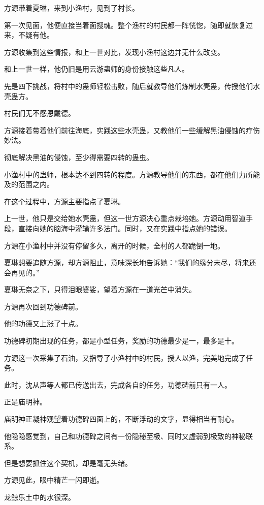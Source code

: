 
\begin{this_body}

方源带着夏琳，来到小渔村，见到了村长。

第一次见面，他便直接当着面搜魂。整个渔村的村民都一阵恍惚，随即就恢复过来，不疑有他。

方源收集到这些情报，和上一世对比，发现小渔村这边并无什么改变。

和上一世一样，他仍旧是用云游蛊师的身份接触这些凡人。

先是四下挑战，将村中的蛊师轻松击败，随后就教导他们炼制水壳蛊，传授他们水壳蛊方。

村民们无不感恩戴德。

方源接着带着他们前往海底，实践这些水壳蛊，又教他们一些缓解黑油侵蚀的疗伤妙法。

彻底解决黑油的侵蚀，至少得需要四转的蛊虫。

小渔村中的蛊师，根本达不到四转的程度。方源教导他们的东西，都在他们力所能及的范围之内。

在这个过程中，方源主要指点了夏琳。

上一世，他只是交给她水壳蛊，但这一世方源决心重点栽培她。方源动用智道手段，直接向她的脑海中灌输许多法门。同时，又在实践中指点她的错误。

方源在小渔村中并没有停留多久，离开的时候，全村的人都跪倒一地。

夏琳想要追随方源，却方源阻止，意味深长地告诉她：“我们的缘分未尽，将来还会再见的。”

夏琳无奈之下，只得泪眼婆娑，望着方源在一道光芒中消失。

方源再次回到功德碑前。

他的功德又上涨了十点。

功德碑初期出现的任务，都是小型任务，奖励的功德最少是一，最多是十。

方源这一次采集了石油，又指导了小渔村中的村民，授人以渔，完美地完成了任务。

此时，沈从声等人都已传送出去，完成各自的任务，功德碑前只有一人。

正是庙明神。

庙明神正凝神观望着功德碑四面上的，不断浮动的文字，显得相当有耐心。

他隐隐感觉到，自己和功德碑之间有一份隐秘至极、同时又虚弱到极致的神秘联系。

但是想要抓住这个契机，却是毫无头绪。

方源见此，眼中精芒一闪即逝。

龙鲸乐土中的水很深。


\end{this_body}
